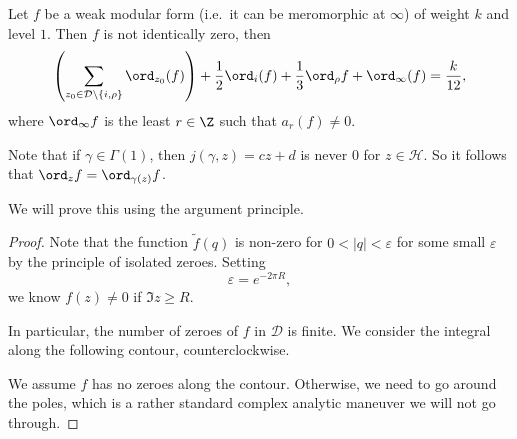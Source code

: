 \documentclass[a4paper]{article}
\renewcommand{\H}{\mathcal{H}}
\begin{document}
\begin{prop}
  Let $f$ be a weak modular form (i.e.\ it can be meromorphic at $\infty$) of weight $k$ and level $1$. Then $f$ is not identically zero, then
  \[
    \left(\sum_{z_0 \in \mathcal{D} \setminus \{i, \rho\}} \ord_{z_0} (f)\right) + \frac{1}{2} \ord_i(f) + \frac{1}{3} \ord_\rho f + \ord_\infty(f) = \frac{k}{12},
  \]
  where $\ord_\infty f$ is the least $r \in \Z$ such that $a_r(f) \not= 0$.
\end{prop}
Note that if $\gamma \in \Gamma(1)$, then $j(\gamma, z) = cz + d$ is never $0$ for $z \in \H$. So it follows that $\ord_z f = \ord_{\gamma(z)} f$.

We will prove this using the argument principle.
\begin{proof}
  Note that the function $\tilde{f}(q)$ is non-zero for $0 < |q| < \varepsilon$ for some small $\varepsilon$ by the principle of isolated zeroes. Setting
  \[
    \varepsilon = e^{-2\pi R},
  \]
  we know $f(z) \not= 0$ if $\Im z \geq R$.

  In particular, the number of zeroes of $f$ in $\mathcal{D}$ is finite. We consider the integral along the following contour, counterclockwise.
  \begin{center}
  \end{center}
  We assume $f$ has no zeroes along the contour. Otherwise, we need to go around the poles, which is a rather standard complex analytic maneuver we will not go through.


\end{proof}
\end{document}
